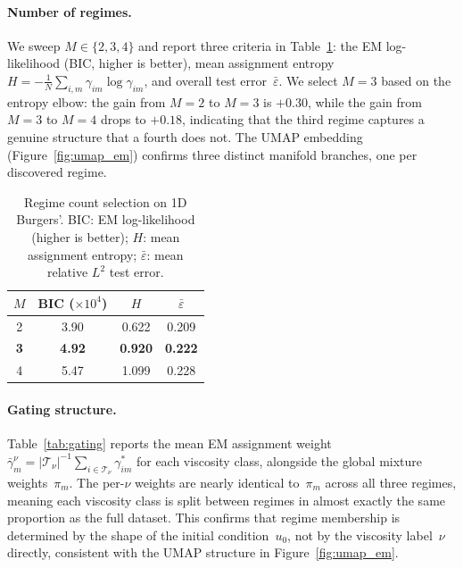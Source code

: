 \documentclass{article}
\begin{document}
\paragraph{Number of regimes.}
We sweep $M\in\{2,3,4\}$ and report three criteria in
Table~\ref{tab:regime_selection}: the EM log-likelihood (BIC, higher is better),
mean assignment entropy $H = -\frac{1}{N}\sum_{i,m}\gamma_{im}\log\gamma_{im}$,
and overall test error~$\bar{\varepsilon}$.
We select $M{=}3$ based on the entropy elbow: the gain from $M{=}2$ to $M{=}3$
is $+0.30$, while the gain from $M{=}3$ to $M{=}4$ drops to $+0.18$,
indicating that the third regime captures a genuine structure that a fourth
does not.
The UMAP embedding (Figure~\ref{fig:umap_em}) confirms three distinct manifold
branches, one per discovered regime.

\begin{table}[h]
\centering
\small
\setlength{\tabcolsep}{12pt}
\caption{Regime count selection on 1D Burgers'.
  BIC: EM log-likelihood (higher is better);
  $H$: mean assignment entropy;
  $\bar{\varepsilon}$: mean relative $L^2$ test error.}
\label{tab:regime_selection}
\begin{tabular}{c c c c}
\toprule
$M$ & BIC (${\times}10^{4}$) & $H$ & $\bar{\varepsilon}$ \\
\midrule
2          & 3.90 & 0.622 & 0.209 \\
\textbf{3} & \textbf{4.92} & \textbf{0.920} & \textbf{0.222} \\
4          & 5.47 & 1.099 & 0.228 \\
\bottomrule
\end{tabular}
\end{table}

\paragraph{Gating structure.}
Table~\ref{tab:gating} reports the mean EM assignment weight
$\bar{\gamma}_m^\nu = |\mathcal{T}_\nu|^{-1}\sum_{i\in\mathcal{T}_\nu}\gamma_{im}^*$
for each viscosity class, alongside the global mixture weights~$\pi_m$.
The per-$\nu$ weights are nearly identical to~$\pi_m$ across all three regimes,
meaning each viscosity class is split between regimes in almost exactly the
same proportion as the full dataset.
This confirms that regime membership is determined by the shape of the initial
condition~$u_0$, not by the viscosity label~$\nu$ directly, consistent with
the UMAP structure in Figure~\ref{fig:umap_em}.
\end{document}
